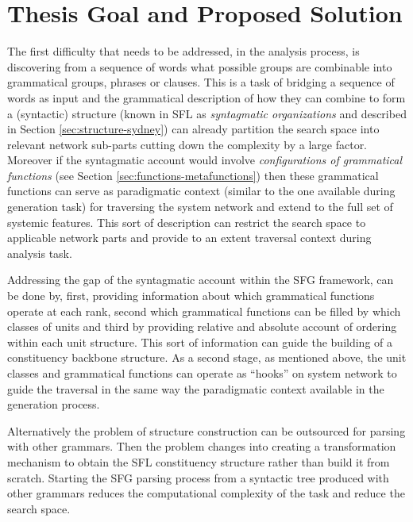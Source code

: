 
\section{Thesis Goal and Proposed Solution}


The first difficulty that needs to be addressed, in the analysis process, is discovering from a sequence of words what possible groups are combinable into grammatical groups, phrases or clauses. This is a task of bridging a sequence of words as input and the grammatical description of how they can combine to form a (syntactic) structure (known in SFL as \textit{syntagmatic organizations} and described in Section \ref{sec:structure-sydney}) can already partition the search space into relevant network sub-parts cutting down the complexity by a large factor. Moreover if the syntagmatic account would involve \textit{configurations of grammatical functions} (see Section \ref{sec:functions-metafunctions}) then these grammatical functions can serve as paradigmatic context (similar to the one available during generation task) for traversing the system network and extend to the full set of systemic features. This sort of description can restrict the search space to applicable network parts and provide to an extent traversal context during analysis task.

Addressing the gap of the syntagmatic account within the SFG framework, can be done by, first, providing information about which grammatical functions operate at each rank, second which grammatical functions can be filled by which classes of units and third by providing relative and absolute account of ordering within each unit structure. This sort of information can guide the building of a constituency backbone structure. As a second stage, as mentioned above, the unit classes and grammatical functions can operate as ``hooks'' on system network to guide the traversal in the same way the paradigmatic context available in the generation process. 

Alternatively the problem of structure construction can be outsourced for parsing with other grammars. Then the problem changes into creating a transformation mechanism to obtain the SFL constituency structure rather than build it from scratch. Starting the SFG parsing process from a syntactic tree produced with other grammars reduces the computational complexity of the task and reduce the search space. 

